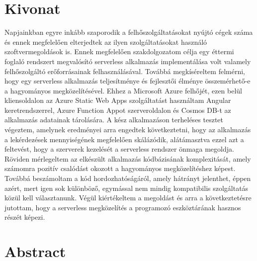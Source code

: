 \chapter*{Kivonat}

Napjainkban egyre inkább szaporodik a felhőszolgáltatásokat nyújtó cégek száma és ennek megfelelően elterjedtek az ilyen szolgáltatásokat használó szoftvermegoldások is. Ennek megfelelően szakdolgozatom célja egy éttermi foglaló rendszert megvalósító serverless alkalmazás implementálása volt valamely felhőszolgáltó erőforrásainak felhasználásával. Továbbá megkíséreltem felmérni, hogy egy serverless alkalmazás teljesítménye és fejlesztői élménye összemérhető-e a hagyományos megközelítésével. Ehhez a Microsoft Azure felhőjét, ezen belül kliensoldalon az Azure Static Web Apps szolgáltatást használtam Angular keretrendszerrel, Azure Function Appot szerveroldalon és Cosmos DB-t az alkalmazás adatainak tárolására. A kész alkalmazáson terheléses tesztet végeztem, amelynek eredményei arra engedtek következtetni, hogy az alkalmazás a lekérdezések mennyiségének megfelelően skálázódik, alátámasztva ezzel azt a feltevést, hogy a szerverek kezelését a serverless rendszer önmaga megoldja. Röviden mérlegeltem az elkészült alkalmazás kódbázisának komplexitását, amely számomra pozitív csalódást okozott a hagyományos megközelítéshez képest. Továbbá beszámoltam a kód hordozhatóságáról, amely hátrányt jelenthet, éppen azért, mert igen sok különböző, egymással nem mindig kompatibilis szolgáltatás közül kell választanunk. 
Végül kiértékeltem a megoldást és arra a következtetésre jutottam, hogy a serverless megközelítés a programozó eszköztárának hasznos részét képezi. 
\vfill

\chapter*{Abstract}

